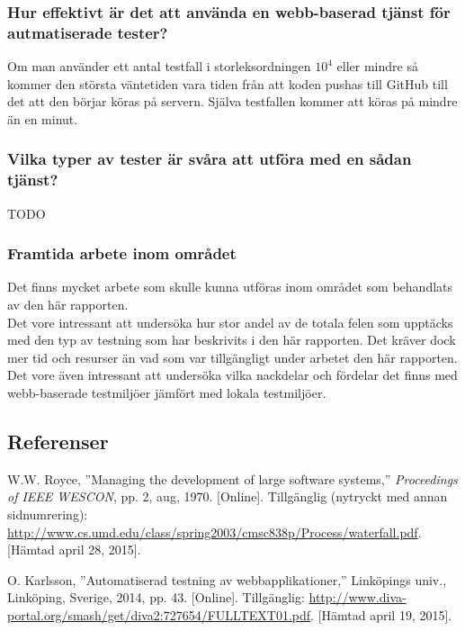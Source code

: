 \subsubsection{Hur effektivt är det att använda en webb-baserad tjänst
för autmatiserade tester?}
Om man använder ett antal testfall i storleksordningen $10^4$ eller
mindre så kommer den största väntetiden vara tiden från att koden
pushas till GitHub till det att den börjar köras på servern. Själva
testfallen kommer att köras på mindre än en minut.

\subsubsection{Vilka typer av tester är svåra att utföra 
med en sådan tjänst?}
TODO

\subsubsection{Framtida arbete inom området}
Det finns mycket arbete som skulle kunna utföras inom området som behandlats
av den här rapporten.\\

Det vore intressant att undersöka hur stor andel av de totala felen
som upptäcks med den typ av testning som har beskrivits i den här rapporten.
Det kräver dock mer tid och resurser än vad som var tillgängligt under
arbetet den här rapporten.\\

Det vore även intressant att undersöka vilka nackdelar och fördelar det
finns med webb-baserade testmiljöer jämfört med lokala
testmiljöer.

\subsection{Referenser}
\vspace{-9mm}
\renewcommand{\refname}{}
\begin{thebibliography}{9}

W.W. Royce, ''Managing the development of large software systems,''
\textit{Proceedings of IEEE WESCON}, pp. 2, aug, 1970.
[Online].
Tillgänglig (nytryckt med annan sidnumrering):
\url{http://www.cs.umd.edu/class/spring2003/cmsc838p/Process/waterfall.pdf}.
[Hämtad april 28, 2015].

O. Karlsson, ''Automatiserad testning av webbapplikationer,''
Linköpings univ., Linköping, Sverige, 2014, pp. 43.
[Online]. 
Tillgänglig: 
\url{http://www.diva-portal.org/smash/get/diva2:727654/FULLTEXT01.pdf}.
[Hämtad april 19, 2015].

\end{thebibliography}

